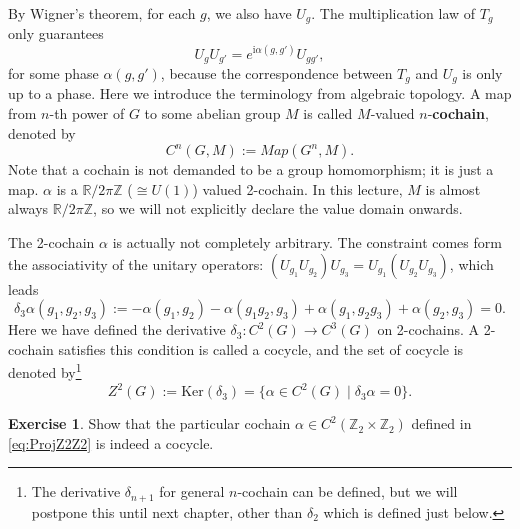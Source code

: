\documentclass[
]{scrartcl}
\numberwithin{equation}{section}
\theoremstyle{definition}
\theoremstyle{definition}
\theoremstyle{definition}
\newtheorem{exercise}{Exercise}[section]
\theoremstyle{definition}
\theoremstyle{remark}
\begin{document}
By Wigner's theorem, for each \(g\), we also have \(U_g\).
The multiplication law of \(T_g\) only guarantees
\begin{equation}
  \label{eq:ProjRepGen}
  U_g U_{g'} = e^{\mathrm{i}\alpha(g,g')}U_{gg'},
\end{equation}
for some phase \(\alpha(g,g')\), because the correspondence between \(T_g\) and \(U_g\) is only up to a phase.
Here we introduce the terminology from algebraic topology.
A map from \(n\)-th power of \(G\) to some abelian group \(M\) is called \(M\)-valued \(n\)-\textbf{cochain}, denoted by
\begin{equation}
  \label{eq:GroupCochain}
  C^n(G,M) := Map(G^n,M).
\end{equation}
Note that a cochain is not demanded to be a group homomorphism; it is just a map.
\(\alpha\) is a \(\mathbb{R}/2\pi\mathbb{Z}\) (\(\cong U(1)\)) valued 2-cochain.
In this lecture, \(M\) is almost always \(\mathbb{R}/2\pi\mathbb{Z}\), so we will not explicitly declare the value domain onwards.

The 2-cochain \(\alpha\) is actually not completely arbitrary.
The constraint comes form the associativity of the unitary operators: \((U_{g_1}U_{g_2})U_{g_3} = U_{g_1}(U_{g_2}U_{g_3})\), which leads
\begin{equation}
  \label{eq:cocycle}
  \delta_3 \alpha (g_1,g_2,g_3) := -\alpha(g_1,g_2)-\alpha(g_1g_2,g_3) + \alpha(g_1,g_2g_3) + \alpha(g_2,g_3) = 0.
\end{equation}
Here we have defined the derivative \(\delta_3: C^2(G) \to C^3(G)\) on 2-cochains.
A 2-cochain satisfies this condition is called a cocycle, and the set of cocycle is denoted by\footnote{The derivative \(\delta_{n+1}\) for general \(n\)-cochain can be defined, but we will postpone this until next chapter, other than \(\delta_2\) which is defined just below.}
\begin{equation}
  \label{eq:GroupCocycle}
  Z^2(G) := \mathrm{Ker}(\delta_3) = \{\alpha\in C^2(G)\mid \delta_3 \alpha = 0\}.
\end{equation}

\begin{exercise}
Show that the particular cochain \(\alpha \in C^2(\mathbb{Z}_2\times\mathbb{Z}_2)\) defined in \eqref{eq:ProjZ2Z2} is indeed a cocycle.
\end{exercise}
\end{document}
